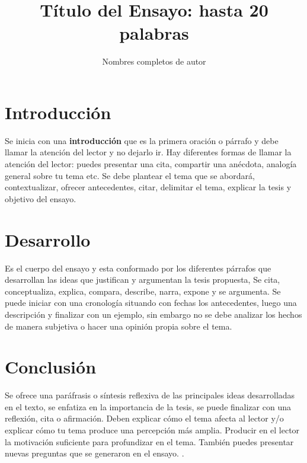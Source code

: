 \documentclass[a4paper,12pt]{article}
\title{Título del Ensayo: hasta 20 palabras}
\author{Nombres completos de autor}
\begin{document}
\maketitle


\section{Introducción}

Se inicia con una \textbf{introducción}  que es la primera oración o párrafo  y debe llamar la atención del lector y no dejarlo ir. Hay diferentes formas de llamar la atención del lector: puedes presentar una cita,  compartir una anécdota, analogía general sobre tu tema etc. Se debe plantear el tema que se abordará, contextualizar, ofrecer antecedentes, citar, delimitar el tema, explicar la tesis y objetivo del ensayo.

\section{Desarrollo}
Es el cuerpo del ensayo y esta conformado por los diferentes párrafos que desarrollan las ideas que justifican y argumentan la tesis propuesta, Se cita, conceptualiza, explica, compara, describe, narra, expone y se argumenta. Se puede iniciar con una cronología situando con fechas los antecedentes, luego una descripción y finalizar con un ejemplo, sin embargo no se debe analizar los hechos de manera subjetiva o hacer una opinión propia sobre el tema. 

\section{Conclusión}
Se ofrece una paráfrasis o síntesis reflexiva de las principales ideas desarrolladas en el texto, se enfatiza en la importancia de la tesis, se puede finalizar con una reflexión, cita o afirmación. Deben explicar cómo el tema afecta al lector y/o explicar cómo tu tema produce una percepción más amplia. Producir en el lector la motivación suficiente para profundizar en el tema. También puedes presentar nuevas preguntas que se generaron en el ensayo. \cite{web1}.


\medskip


\end{document}
